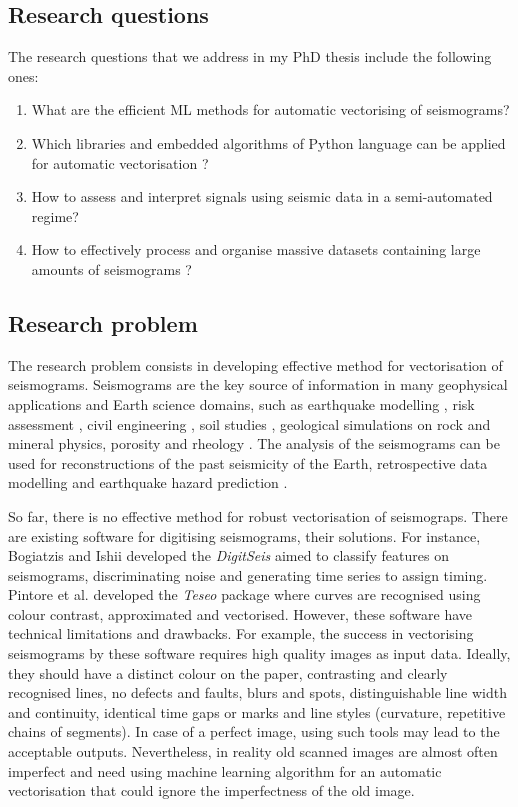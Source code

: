 \documentclass[a4paper,english,12pt]{article}
\begin{document}
\subsection{Research questions}
The research questions that we address in my PhD thesis include the following ones:
\begin{enumerate}
    \item What are the efficient ML methods for automatic vectorising of seismograms? 
    \item Which libraries and embedded algorithms of Python language can be applied for automatic vectorisation ?
    \item How to assess and interpret signals using seismic data in a semi-automated regime? 
    \item How to effectively process and organise massive datasets containing large amounts of seismograms ?
\end{enumerate}

\subsection{Research problem} 

The research problem consists in developing effective method for vectorisation of seismograms. Seismograms are the key source of information in many geophysical applications and Earth science domains, such as earthquake modelling \cite{Kameda}, risk assessment \cite{Frankel,Panakkat}, civil engineering \cite{Savvaidis}, soil studies \cite{Papadakis}, geological simulations on rock and mineral physics, porosity and rheology \cite{Singhetal2020,DiMartino}. The analysis of the seismograms can be used for reconstructions of the past seismicity of the Earth, retrospective data modelling and earthquake hazard prediction \cite{Zhuetal2021}.  

So far, there is no effective method for robust vectorisation of seismograps. There are existing software for digitising seismograms, their solutions. For instance, Bogiatzis and Ishii developed the \emph{DigitSeis} \cite{Bogiatzis} aimed to classify features on seismograms, discriminating noise and generating time series to assign timing. Pintore et al. \cite{Pintoreetal2005} developed the \emph{Teseo} package where curves are recognised using colour contrast, approximated and vectorised. However, these software have technical limitations and drawbacks. For example, the success in vectorising seismograms by these software requires high quality images as input data. Ideally, they should have a distinct colour on the paper, contrasting and clearly recognised lines, no defects and faults, blurs and spots, distinguishable line width and continuity, identical time gaps or marks and line styles (curvature, repetitive chains of segments). In case of a perfect image, using such tools may lead to the acceptable outputs. Nevertheless, in reality old scanned images are almost often imperfect and need using machine learning algorithm for an automatic vectorisation that could ignore the imperfectness of the old image. 
\end{document}
